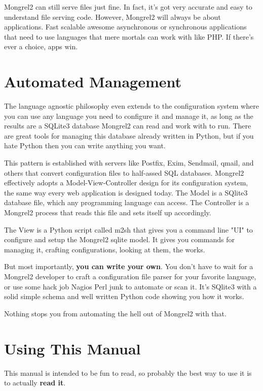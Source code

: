 Mongrel2 can still serve files just fine.  In fact, it's got very accurate and easy
to understand file serving code.  However, Mongrel2 will always be about applications.
Fast scalable awesome asynchronous or synchronous applications that need to use languages
that mere mortals can work with like PHP.  If there's ever a choice, apps win.

\section{Automated Management}

The language agnostic philosophy even extends to the configuration system where
you can use any language you need to configure it and manage it, as long as the
results are a SQLite3 database Mongrel2 can read and work with to run.  There are
great tools for managing this database already written in Python, but if you hate
Python then you can write anything you want.

This pattern is established with servers like Postfix, Exim, Sendmail, qmail,
and others that convert configuration files to half-assed SQL databases.
Mongrel2 effectively adopts a Model-View-Controller design for its
configuration system, the same way every web application is designed today.
The Model is a SQlite3 database file, which any programming language can access.
The Controller is a Mongrel2 process that reads this file and sets itself up
accordingly.

The View is a Python script called m2sh that gives you a command line "UI" to
configure and setup the Mongrel2 sqlite model.  It gives you commands for 
managing it, crafting configurations, looking at them, the works.

But most importantly, {\bf you can write your own}.  You don't have to wait
for a Mongrel2 developer to craft a configuration file parser for your favorite
language, or use some hack job Nagios Perl junk to automate or scan it.  It's
SQlite3 with a solid simple schema and well written Python code showing you how
it works.

Nothing stops you from automating the hell out of Mongrel2 with that.


\section{Using This Manual}

This manual is intended to be fun to read, so probably the best way to use it
is to actually {\bf read it}.

